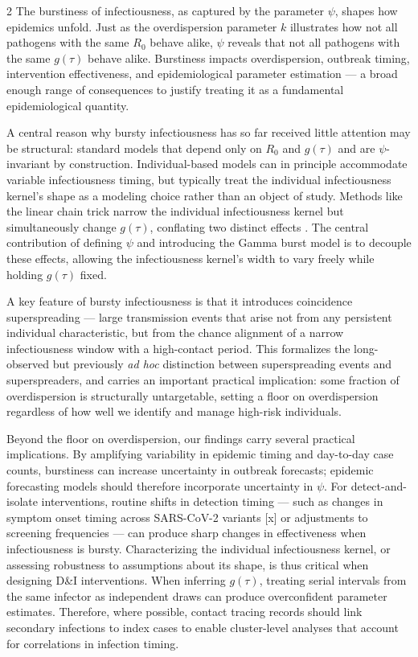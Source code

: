 \documentclass[10pt]{article}
\begin{document}
\begin{multicols}{2}
The burstiness of infectiousness, as captured by the parameter $\psi$, shapes how epidemics unfold. Just as the overdispersion parameter $k$ illustrates how not all pathogens with the same $R_0$ behave alike, $\psi$ reveals that not all pathogens with the same $g(\tau)$ behave alike. Burstiness impacts overdispersion, outbreak timing, intervention effectiveness, and epidemiological parameter estimation --- a broad enough range of consequences to justify treating it as a fundamental epidemiological quantity.

A central reason why bursty infectiousness has so far received little attention may be structural: standard models that depend only on $R_0$ and $g(\tau)$ and are $\psi$-invariant by construction. Individual-based models can in principle accommodate variable infectiousness timing, but typically treat the individual infectiousness kernel's shape as a modeling choice rather than an object of study. Methods like the linear chain trick narrow the individual infectiousness kernel but simultaneously change $g(\tau)$, conflating two distinct effects \citep{wearing_appropriate_2005, lloyd_realistic_2001}. The central contribution of defining $\psi$ and introducing the Gamma burst model is to decouple these effects, allowing the infectiousness kernel's width to vary freely while holding $g(\tau)$ fixed. 

A key feature of bursty infectiousness is that it introduces coincidence superspreading --- large transmission events that arise not from any persistent individual characteristic, but from the chance alignment of a narrow infectiousness window with a high-contact period. This formalizes the long-observed but previously {\it ad hoc} distinction between superspreading events and superspreaders, and carries an important practical implication: some fraction of overdispersion is structurally untargetable, setting a floor on overdispersion regardless of how well we identify and manage high-risk individuals. 

Beyond the floor on overdispersion, our findings carry several practical implications. By amplifying variability in epidemic timing and day-to-day case counts, burstiness can increase uncertainty in outbreak forecasts; epidemic forecasting models should therefore incorporate uncertainty in $\psi$. For detect-and-isolate interventions, routine shifts in detection timing --- such as changes in symptom onset timing across SARS-CoV-2 variants [x] or adjustments to screening frequencies --- can produce sharp changes in effectiveness when infectiousness is bursty. Characterizing the individual infectiousness kernel, or assessing robustness to assumptions about its shape, is thus critical when designing D\&I interventions. When inferring $g(\tau)$, treating serial intervals from the same infector as independent draws can produce overconfident parameter estimates. Therefore, where possible, contact tracing records should link secondary infections to index cases to enable cluster-level analyses that account for correlations in infection timing. 


\end{multicols}
\end{document}
